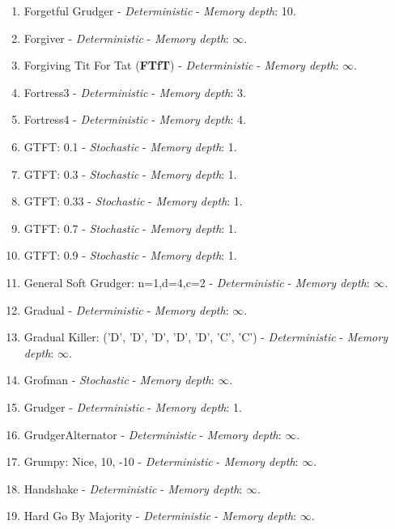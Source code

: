 \documentclass[10pt,letterpaper]{article}
\begin{document}
\begin{enumerate}
\item Forgetful Grudger - \textit{Deterministic} - \textit{Memory depth}: 10. \cite{axelrodproject}
\item Forgiver - \textit{Deterministic} - \textit{Memory depth}: \(\infty\). \cite{axelrodproject}
\item Forgiving Tit For Tat (\textbf{FTfT}) - \textit{Deterministic} - \textit{Memory depth}: \(\infty\). \cite{axelrodproject}
\item Fortress3 - \textit{Deterministic} - \textit{Memory depth}: 3. \cite{Ashlock2006b}
\item Fortress4 - \textit{Deterministic} - \textit{Memory depth}: 4. \cite{Ashlock2006b}
\item GTFT: 0.1 - \textit{Stochastic} - \textit{Memory depth}: 1.
\item GTFT: 0.3 - \textit{Stochastic} - \textit{Memory depth}: 1.
\item GTFT: 0.33 - \textit{Stochastic} - \textit{Memory depth}: 1. \cite{Gaudesi2016, Nowak1993}
\item GTFT: 0.7 - \textit{Stochastic} - \textit{Memory depth}: 1.
\item GTFT: 0.9 - \textit{Stochastic} - \textit{Memory depth}: 1.
\item General Soft Grudger: n=1,d=4,c=2 - \textit{Deterministic} - \textit{Memory depth}: \(\infty\). \cite{axelrodproject}
\item Gradual - \textit{Deterministic} - \textit{Memory depth}: \(\infty\). \cite{Beaufils1997}
\item Gradual Killer: ('D', 'D', 'D', 'D', 'D', 'C', 'C') - \textit{Deterministic} - \textit{Memory depth}: \(\infty\). \cite{Prison1998}
\item Grofman - \textit{Stochastic} - \textit{Memory depth}: \(\infty\). \cite{Axelrod1980}
\item Grudger - \textit{Deterministic} - \textit{Memory depth}: 1. \cite{Axelrod1980, Banks1990, Beaufils1997, Berg2015, Li2011}
\item GrudgerAlternator - \textit{Deterministic} - \textit{Memory depth}: \(\infty\). \cite{Prison1998}
\item Grumpy: Nice, 10, -10 - \textit{Deterministic} - \textit{Memory depth}: \(\infty\). \cite{axelrodproject}
\item Handshake - \textit{Deterministic} - \textit{Memory depth}: \(\infty\). \cite{Robson1990}
\item Hard Go By Majority - \textit{Deterministic} - \textit{Memory depth}: \(\infty\). \cite{Mittal2009}

\end{enumerate}
\end{document}
